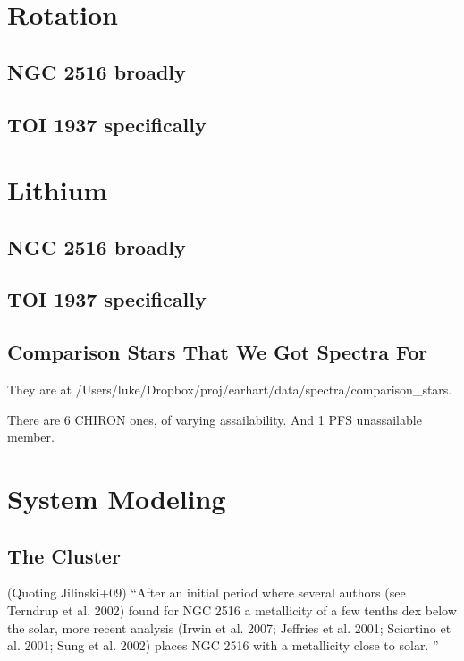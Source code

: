 \documentclass[12pt,twocolumn,tighten]{aastex63}
\begin{document}
\section{Rotation}

  \subsection{NGC 2516 broadly}
  \subsection{TOI 1937 specifically}

\section{Lithium}

  \subsection{NGC 2516 broadly}
  \subsection{TOI 1937 specifically}

  \subsection{Comparison Stars That We Got Spectra For}
  They are at
  /Users/luke/Dropbox/proj/earhart/data/spectra/comparison\_stars.

  There are 6 CHIRON ones, of varying assailability.
  And 1 PFS unassailable member.

\section{System Modeling}
\label{sec:system}

\subsection{The Cluster}
\label{subsec:cluster}

(Quoting Jilinski+09)
``After an initial period where several authors (see Terndrup et al.
2002) found for NGC 2516 a metallicity of a few tenths dex below the
solar, more recent analysis (Irwin et al. 2007; Jeffries et al.  2001;
Sciortino et al. 2001; Sung et al. 2002) places NGC 2516 with a
metallicity close to solar. ''
\end{document}
